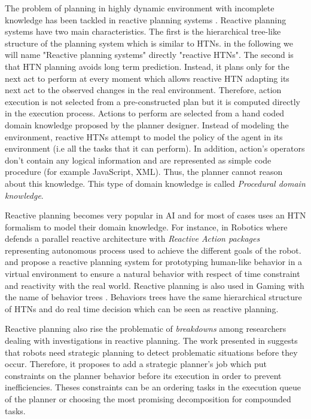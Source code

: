 \documentclass[conference]{IEEEtran}
\begin{document}
	\par The problem of planning in highly dynamic environment with incomplete knowledge has been tackled in reactive planning systems \cite{schoppers1987universal}. 
	Reactive planning systems have two main characteristics. The first is the hierarchical tree-like structure of the planning system which is similar to HTNs. in the following we will name  "Reactive planning systems" directly "reactive HTNs".
	The second is that HTN planning avoids long term prediction. Instead, it plans only for the next act to perform at every moment which allows reactive HTN adapting its next act to the observed changes in the real environment. Therefore, action execution is not selected from a pre-constructed plan but it is computed directly in the execution process.
	Actions to perform are selected from a hand coded domain knowledge proposed by the planner designer. Instead of modeling the environment, reactive HTNs attempt to model the policy of the agent in its environment (i.e all the tasks that it can perform). In addition, action's operators don't contain any logical information and are represented as simple code procedure (for example JavaScript, XML). Thus, the planner cannot reason about this knowledge. This type of domain knowledge is called \emph{Procedural domain knowledge}.
	\par Reactive planning becomes very popular in AI and for most of cases uses an HTN formalism to model their domain knowledge. For instance, in Robotics where \cite{firby1987investigation} defends a parallel reactive architecture with \emph{Reactive Action packages} representing autonomous process used to achieve the different goals of the robot. \cite{bryson2001intelligence} and \cite{brom2005hierarchical} propose a reactive planning system for prototyping human-like behavior in a virtual environment to ensure a natural behavior with respect of time constraint and reactivity with the real world. Reactive planning is also used in Gaming with the name of  behavior trees \cite{isla2005handling}. Behaviors trees have the same hierarchical structure of HTNs and do real time decision which can be seen as reactive planning. 
	

	\par Reactive planning also rise the problematic  of \emph{breakdowns} among researchers dealing with investigations in reactive planning. The work presented in  \cite{firby1987investigation} suggests that robots need strategic planning to detect problematic situations before they occur. Therefore, it proposes to add a strategic planner's job which put constraints on the planner behavior before its execution in order to prevent inefficiencies. Theses constraints can be an ordering tasks in the execution queue of the planner or choosing the most promising decomposition for compounded tasks.
	
\end{document}
